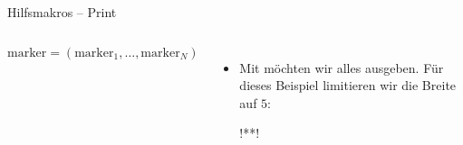 \begin{frame}[c,fragile]{Hilfsmakros -- Print}
    \footnotesize\begin{columns}[c,onlytextwidth]%
\begin{algorithm}[H]
    \PreCode
    \StartCode
    \(\mathrm{marker} = (\mathrm{marker}_1, \ldots, \mathrm{marker}_N)\)\;
\end{algorithm}
\begin{itemize}[<+(1)->]
    \item Mit \bxlatex{\\SievePrint} möchten wir alles ausgeben. Für dieses Beispiel limitieren wir die Breite auf \(5\):
\begin{plainxlatex}[morekeywords={[5]{\\i}}]
!**!\newcommand{\SievePrint}{
  !*\onslide<4->*!\foreach \cell in {1,...,\N}{
    !*\onslide<5->*!\SievePrintCell{\cell}
    !*\onslide<6->*!\calc!**!\check = mod(\cell, 5);
    !*\onslide<7->*!\ifnum!**!\check=0 \newline \fi
  !*\onslide<4->*!}
!*\onslide<3->*!}
\end{plainxlatex}
\end{itemize}
\end{columns}
\end{frame}


